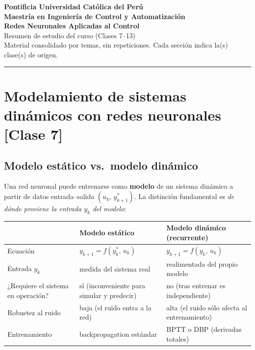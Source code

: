 \documentclass[11pt,a4paper]{article}
\begin{document}
\begin{center}
{\large\bfseries Pontificia Universidad Católica del Perú}\\[2pt]
{\bfseries Maestría en Ingeniería de Control y Automatización}\\[8pt]
{\Large\bfseries Redes Neuronales Aplicadas al Control}\\[3pt]
{\large Resumen de estudio del curso (Clases 7--13)}\\[4pt]
{\small Material consolidado por temas, sin repeticiones. Cada sección indica la(s) clase(s) de origen.}
\end{center}

\vspace{2pt}
\hrule
\vspace{6pt}

\tableofcontents

\vspace{6pt}

\section{Modelamiento de sistemas dinámicos con redes neuronales \hfill {\normalsize [Clase 7]}}

\subsection{Modelo estático vs.\ modelo dinámico}

Una red neuronal puede entrenarse como \textbf{modelo} de un sistema dinámico a partir de datos entrada--salida $(u_k,\,y^{*}_{k+1})$. La distinción fundamental es \emph{de dónde proviene la entrada $y_k$ del modelo}:

\begin{center}
\small
\begin{tabular}{p{3.6cm} p{5.3cm} p{5.6cm}}
\toprule
 & \textbf{Modelo estático} & \textbf{Modelo dinámico (recurrente)}\\
\midrule
Ecuación & $y_{k+1}=f(y^{*}_k,\,u_k)$ & $y_{k+1}=f(y_k,\,u_k)$\\
Entrada $y_k$ & medida del sistema real & realimentada del propio modelo\\
¿Requiere el sistema en operación? & sí (inconveniente para simular y predecir) & no (tras entrenar es independiente)\\
Robustez al ruido & baja (el ruido entra a la red) & alta (el ruido sólo afecta al entrenamiento)\\
Entrenamiento & backpropagation estándar & BPTT o DBP (derivadas totales)\\
\bottomrule
\end{tabular}
\end{center}
\end{document}
